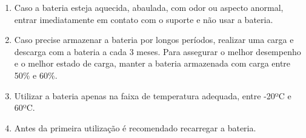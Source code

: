 \begin{enumerate}
\item Caso a bateria esteja aquecida, abaulada, com odor ou aspecto anormal, entrar imediatamente em contato com o suporte e não usar a bateria.
\item  Caso precise armazenar a bateria por longos períodos, realizar uma carga e descarga com a bateria a cada 3 meses. Para assegurar o melhor desempenho e o melhor estado de carga, manter a bateria armazenada com carga entre 50\% e 60\%.
\item Utilizar a bateria apenas na faixa de temperatura adequada, entre -20ºC e 60ºC.
\item Antes da primeira utilização é recomendado recarregar a bateria.
\end{enumerate}
\newpage   

